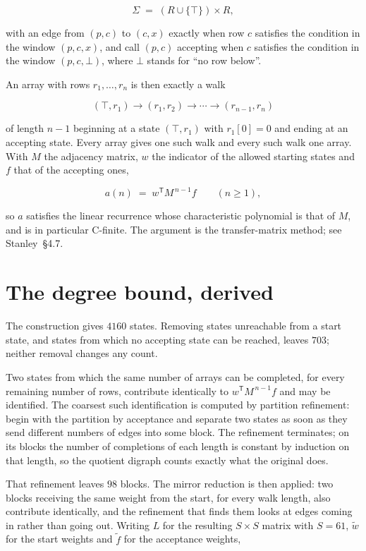 \documentclass[11pt]{article}
\theoremstyle{definition}
\begin{document}
\[\Sigma \;=\; (R \cup \{\top\}) \times R,\]

with an edge from $(p,c)$ to $(c,x)$ exactly when row $c$ satisfies the condition in the window $(p,c,x)$, and call $(p,c)$ accepting when $c$ satisfies the condition in the window $(p,c,\bot)$, where $\bot$ stands for ``no row below''.

An array with rows $r_1,\dots,r_n$ is then exactly a walk

\[(\top,r_1) \to (r_1,r_2) \to \cdots \to (r_{n-1},r_n)\]

of length $n-1$ beginning at a state $(\top,r_1)$ with $r_1[0]=0$ and ending at an accepting state. Every array gives one such walk and every such walk one array. With $M$ the adjacency matrix, $w$ the indicator of the allowed starting states and $f$ that of the accepting ones,

\[a(n) \;=\; w^{\mathsf T} M^{\,n-1} f \qquad (n \ge 1),\]

so $a$ satisfies the linear recurrence whose characteristic polynomial is that of $M$, and is in particular C-finite. The argument is the transfer-matrix method; see Stanley~\S4.7.

\section{The degree bound, derived}

The construction gives $4160$ states. Removing states unreachable from a start state, and states from which no accepting state can be reached, leaves $703$; neither removal changes any count.

Two states from which the same number of arrays can be completed, for every remaining number of rows, contribute identically to $w^{\mathsf T}M^{\,n-1}f$ and may be identified. The coarsest such identification is computed by partition refinement: begin with the partition by acceptance and separate two states as soon as they send different numbers of edges into some block. The refinement terminates; on its blocks the number of completions of each length is constant by induction on that length, so the quotient digraph counts exactly what the original does.

That refinement leaves $98$ blocks. The mirror reduction is then applied: two blocks receiving the same weight from the start, for every walk length, also contribute identically, and the refinement that finds them looks at edges coming in rather than going out. Writing $L$ for the resulting $S \times S$ matrix with $S = 61$, $\tilde w$ for the start weights and $\tilde f$ for the acceptance weights,
\end{document}
